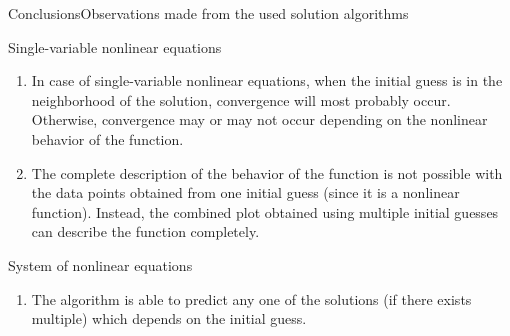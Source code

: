 \documentclass{beamer}
\begin{document}
\begin{frame}[t]{Conclusions}{Observations made from the used solution algorithms}
        \begin{block}{\footnotesize Single-variable nonlinear equations}
            \footnotesize
            \begin{enumerate}
                \item In case of single-variable nonlinear equations, when the initial guess is in the neighborhood of the solution, convergence will most probably occur. Otherwise, convergence may or may not occur depending on the nonlinear behavior of the function.
                \item The complete description of the behavior of the function is not possible with the data points obtained from one initial guess (since it is a nonlinear function). Instead, the combined plot obtained using multiple initial guesses can describe the function completely.
            \end{enumerate}
        \end{block}
        \begin{block}{\footnotesize System of nonlinear equations}
            \footnotesize
            \begin{enumerate}
                \item The algorithm is able to predict any one of the solutions (if there exists multiple) which depends on the initial guess.
            \end{enumerate}
        \end{block}
\end{frame}
\end{document}
